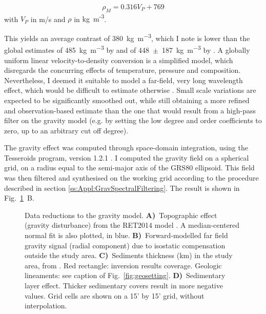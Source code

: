 \begin{equation}
	\label{eq:ACY400}
	\rho_M = 0.316 V_P + 769
\end{equation}
with $V_P$ in m/s and $\rho$ in {kg~m\textsuperscript{-3}}.

This yields an average contrast of 380~\si{\kilo \gram \per \cubic \metre}, which I note is lower than the global estimates of 485~\si{\kilo \gram \per \cubic \metre} by \textcite{Tenzer2012contrast} and of 448~$\pm$~187~\si{\kilo \gram \per \cubic \metre} by \textcite{Sjoberg2011}.
A globally uniform linear velocity-to-density conversion is a simplified model, which disregards the concurring effects of temperature, pressure and composition.
Nevertheless, I deemed it suitable to model a far-field, very long wavelength effect, which would be difficult to estimate otherwise \parencite[for a different approach, based on topography and the Airy-Heiskanen isostatic model, see][]{Grombein2016}.
Small scale variations are expected to be significantly smoothed out, while still obtaining a more refined and observation-based estimate than the one that would result from a high-pass filter on the gravity model (e.g. by setting the low degree and order coefficients to zero, up to an arbitrary cut off degree).

The gravity effect was computed through space-domain integration, using the Tesseroids program, version {1.2.1} \parencites{Uieda2016}{UiedaTesseroids}.
I computed the gravity field on a spherical grid, on a radius equal to the semi-major axis of the {GRS80} ellipsoid.
This field was then filtered and synthesised on the working grid according to the procedure described in section \ref{ss:Appl:GravSpectralFiltering}.
The result is shown in Fig.~\ref{fig:g_red}~B.

\begin{figure}
    \begin{adjustbox}{center}
    \end{adjustbox}
	\caption[Data reductions to the gravity model.]{Data reductions to the gravity model.
	\textbf{A)}~Topographic effect (gravity disturbance) from the {RET2014} model \parencite{Rexer2016}. A median-centered normal fit is also plotted, in blue.
	\textbf{B)}~Forward-modelled far field gravity signal (radial component) due to isostatic compensation outside the study area.
	\textbf{C)}~Sediments thickness (km) in the study area, from \textcite{Tesauro2008}. Red rectangle: inversion results coverage. Geologic lineaments: see caption of Fig.~\ref{fig:geosetting}.
	\textbf{D)}~Sedimentary layer effect. Thicker sedimentary covers result in more negative values.
	Grid cells are shown on a 15' by 15' grid, without interpolation.}
	\label{fig:g_red}
\end{figure}

